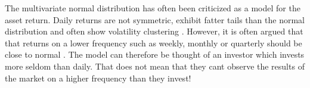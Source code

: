 \documentclass[oneside]{book}\usepackage{knitr}
\begin{document}
The multivariate normal distribution has often been criticized as a model for the asset return. 
Daily returns are not symmetric, exhibit fatter tails than the normal distribution and often show volatility clustering \cite{cont2001empirical}.  
However, it is often argued that that returns on a lower frequency such as weekly, monthly or quarterly should be close to normal \cite{REF}.
The model can therefore be thought of an investor which invests more seldom than daily.
That does not mean that they cant observe the results of the market on a higher frequency than they invest!
\end{document}

